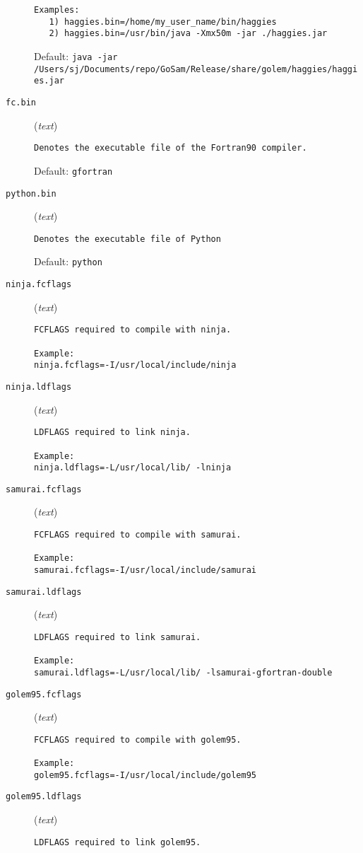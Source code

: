 \begin{description}
\begin{verbatim}
Examples:
   1) haggies.bin=/home/my_user_name/bin/haggies
   2) haggies.bin=/usr/bin/java -Xmx50m -jar ./haggies.jar
\end{verbatim}
Default: \verb|java -jar /Users/sj/Documents/repo/GoSam/Release/share/golem/haggies/haggies.jar|
\item[\texttt{fc.bin}] (\textit{text})
\begin{verbatim}
Denotes the executable file of the Fortran90 compiler.
\end{verbatim}
Default: \verb|gfortran|
\item[\texttt{python.bin}] (\textit{text})
\begin{verbatim}
Denotes the executable file of Python
\end{verbatim}
Default: \verb|python|
\item[\texttt{ninja.fcflags}] (\textit{text})
\begin{verbatim}
FCFLAGS required to compile with ninja.

Example:
ninja.fcflags=-I/usr/local/include/ninja
\end{verbatim}
\item[\texttt{ninja.ldflags}] (\textit{text})
\begin{verbatim}
LDFLAGS required to link ninja.

Example:
ninja.ldflags=-L/usr/local/lib/ -lninja
\end{verbatim}
\item[\texttt{samurai.fcflags}] (\textit{text})
\begin{verbatim}
FCFLAGS required to compile with samurai.

Example:
samurai.fcflags=-I/usr/local/include/samurai
\end{verbatim}
\item[\texttt{samurai.ldflags}] (\textit{text})
\begin{verbatim}
LDFLAGS required to link samurai.

Example:
samurai.ldflags=-L/usr/local/lib/ -lsamurai-gfortran-double
\end{verbatim}
\item[\texttt{golem95.fcflags}] (\textit{text})
\begin{verbatim}
FCFLAGS required to compile with golem95.

Example:
golem95.fcflags=-I/usr/local/include/golem95
\end{verbatim}
\item[\texttt{golem95.ldflags}] (\textit{text})
\begin{verbatim}
LDFLAGS required to link golem95.


\end{verbatim}
\end{description}
